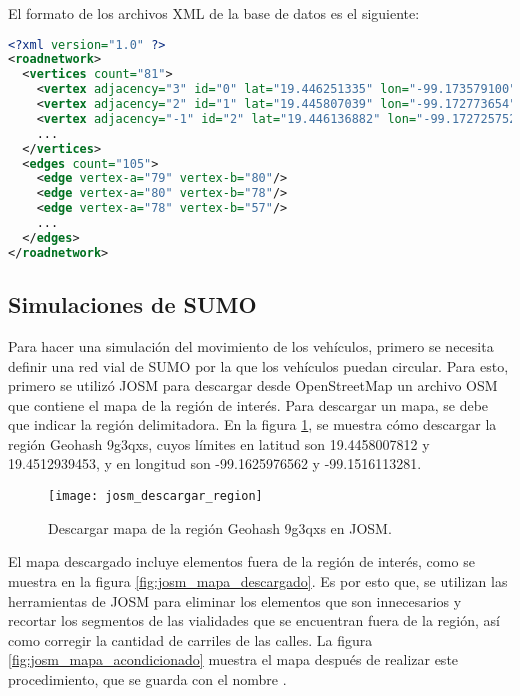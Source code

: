 El formato de los archivos XML de la base de datos es el siguiente:

\begin{lstlisting}[language=XML]
<?xml version="1.0" ?>
<roadnetwork>
  <vertices count="81">
    <vertex adjacency="3" id="0" lat="19.446251335" lon="-99.173579100"/>
    <vertex adjacency="2" id="1" lat="19.445807039" lon="-99.172773654"/>
    <vertex adjacency="-1" id="2" lat="19.446136882" lon="-99.172725752"/>
    ...
  </vertices>
  <edges count="105">
    <edge vertex-a="79" vertex-b="80"/>
    <edge vertex-a="80" vertex-b="78"/>
    <edge vertex-a="78" vertex-b="57"/>
    ...
  </edges>
</roadnetwork>
\end{lstlisting}

\subsection{Simulaciones de SUMO}
\label{subsec:simulaciones_sumo}

Para hacer una simulación del movimiento de los vehículos, primero se necesita
definir una red vial de SUMO por la que los vehículos puedan circular. Para
esto, primero se utilizó JOSM para descargar desde OpenStreetMap un archivo OSM
que contiene el mapa de la región de interés. Para descargar un mapa, se debe
que indicar la región delimitadora. En la figura
\ref{fig:josm_descargar_region}, se muestra cómo descargar la región Geohash
9g3qxs, cuyos límites en latitud son 19.4458007812 y 19.4512939453, y
en longitud son -99.1625976562 y -99.1516113281.

\begin{figure}[th!]
\centering
\texttt{[image: josm\_descargar\_region]}
\decoRule
\caption[Descargar mapa de la región Geohash 9g3qxs en JOSM]{Descargar mapa de
la región Geohash 9g3qxs en JOSM.}
\label{fig:josm_descargar_region}
\end{figure}

El mapa descargado incluye elementos fuera de la región de interés, como se
muestra en la figura \ref{fig:josm_mapa_descargado}. Es por esto que, se
utilizan las herramientas de JOSM para eliminar los elementos que son
innecesarios y recortar los segmentos de las vialidades que se encuentran fuera
de la región, así como corregir la cantidad de carriles de las calles. La
figura \ref{fig:josm_mapa_acondicionado} muestra el mapa después de realizar
este procedimiento, que se guarda con el nombre .

